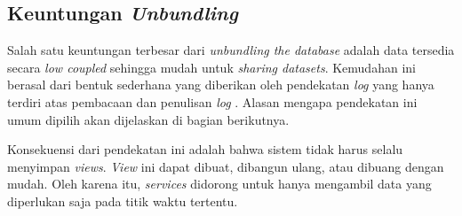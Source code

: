 \subsection{Keuntungan \textit{Unbundling}}

Salah satu keuntungan terbesar dari \textit{unbundling the database} adalah data tersedia secara \textit{low coupled} sehingga mudah untuk \textit{sharing datasets}. Kemudahan ini berasal dari bentuk sederhana yang diberikan oleh pendekatan \textit{log} yang hanya terdiri atas pembacaan dan penulisan \textit{log} \parencite{leverageDatabaseInsideOut}. Alasan mengapa pendekatan ini umum dipilih akan dijelaskan di bagian berikutnya.

Konsekuensi dari pendekatan ini adalah bahwa sistem tidak harus selalu menyimpan \textit{views}. \textit{View} ini dapat dibuat, dibangun ulang, atau dibuang dengan mudah. Oleh karena itu, \textit{services} didorong untuk hanya mengambil data yang diperlukan saja pada titik waktu tertentu.